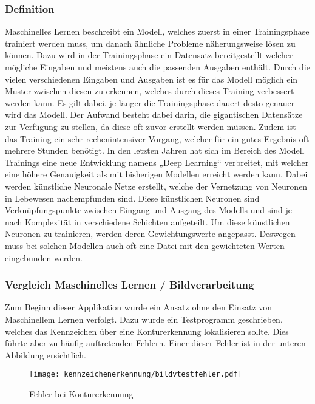 \subsubsection{Definition}
Maschinelles Lernen beschreibt ein Modell, welches zuerst in einer Trainingsphase trainiert werden muss, um danach ähnliche Probleme näherungsweise lösen zu können. 
Dazu wird in der Trainingsphase ein Datensatz bereitgestellt welcher mögliche Eingaben und meistens auch die passenden Ausgaben enthält. Durch die vielen verschiedenen 
Eingaben und Ausgaben ist es für das Modell möglich ein Muster zwischen diesen zu erkennen, welches durch dieses Training verbessert werden kann. Es gilt dabei, je 
länger die Trainingsphase dauert desto genauer wird das Modell. Der Aufwand besteht dabei darin, die gigantischen Datensätze zur Verfügung zu stellen, da diese oft 
zuvor erstellt werden müssen. Zudem ist das Training ein sehr rechenintensiver Vorgang, welcher für ein gutes Ergebnis oft mehrere Stunden benötigt. In den letzten 
Jahren hat sich im Bereich des Modell Trainings eine neue Entwicklung namens „Deep Learning“ verbreitet, mit welcher eine höhere Genauigkeit als mit bisherigen Modellen 
erreicht werden kann. Dabei werden künstliche Neuronale Netze erstellt, welche der Vernetzung von Neuronen in Lebewesen nachempfunden sind. Diese künstlichen Neuronen 
sind Verknüpfungspunkte zwischen Eingang und Ausgang des Modells und sind je nach Komplexität in verschiedene Schichten aufgeteilt. Um diese künstlichen Neuronen zu 
trainieren, werden deren Gewichtungswerte angepasst. Deswegen muss bei solchen Modellen auch oft eine Datei mit den gewichteten Werten eingebunden werden.

\subsubsection{Vergleich Maschinelles Lernen / Bildverarbeitung}
Zum Beginn dieser Applikation wurde ein Ansatz ohne den Einsatz von Maschinellem Lernen verfolgt. Dazu wurde ein Testprogramm geschrieben, welches das Kennzeichen 
über eine Konturerkennung lokalisieren sollte. Dies führte aber zu häufig auftretenden Fehlern. Einer dieser Fehler ist in der unteren Abbildung ersichtlich.

\begin{figure}[H]
    \centering
    \texttt{[image: kennzeichenerkennung/bildvtestfehler.pdf]}
    \caption{Fehler bei Konturerkennung}
\end{figure}

